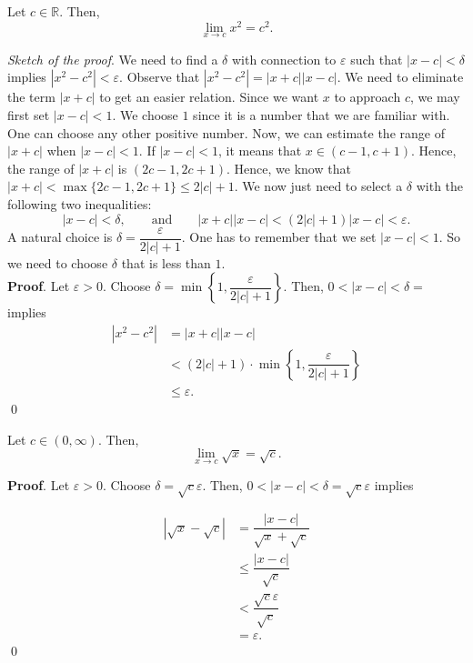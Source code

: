 \documentclass[11pt]{book}
\theoremstyle{break}
\theoremstyle{no_label}
\newcommand{\bbR}{\mathbb{R}}
\numberwithin{equation}{section}
\begin{document}
\begin{proposition}
    Let $c\in\bbR$. Then, $$\lim_{x\to c}x^2=c^2.$$
\end{proposition}
\textit{Sketch of the proof}. We need to find a $\delta$ with connection to $\varepsilon$ such that $|x-c|<\delta$ implies $|x^2-c^2|<\varepsilon$. Observe that $|x^2-c^2|=|x+c||x-c|$. We need to eliminate the term $|x+c|$ to get an easier relation. Since we want $x$ to approach $c$, we may first set $|x-c|<1$. We choose $1$ since it is a number that we are familiar with. One can choose any other positive number. Now, we can estimate the range of $|x+c|$ when $|x-c|<1$. If $|x-c|<1$, it means that $x\in(c-1, c+1)$. Hence, the range of $|x+c|$ is $(2c-1, 2c+1)$. Hence, we know that $|x+c|<\max\{2c-1, 2c+1\}\leq 2|c|+1$. We now just need to select a $\delta$ with the following two inequalities: 
\begin{equation*}
    |x-c|<\delta, \qquad\text{and}\qquad |x+c||x-c|<(2|c|+1)|x-c|<\varepsilon.
\end{equation*}
A natural choice is $\delta=\dfrac{\varepsilon}{2|c|+1}$. One has to remember that we set $|x-c|<1$. So we need to choose $\delta$ that is less than $1$.\\\setlength{\delimitershortfall}{0pt}
\textbf{Proof}. Let $\varepsilon>0$. Choose $\delta=\min\left\{1, \dfrac{\varepsilon}{2|c|+1}\right\}$. Then, $0<|x-c|<\delta=$ implies \begin{align*}
    |x^2-c^2|&=|x+c||x-c|\\
    &<(2|c|+1)\cdot\min\left\{1, \dfrac{\varepsilon}{2|c|+1}\right\}\\
    &\leq\varepsilon.
\end{align*} \qed

\setlength{\delimitershortfall}{13.5pt}

\begin{proposition}
    Let $c\in(0, \infty)$. Then, $$\lim_{x\to c}\sqrt{x}=\sqrt{c}.$$
\end{proposition}
\textbf{Proof}. Let $\varepsilon>0$. Choose $\delta=\sqrt{c}\varepsilon$. Then, $0<|x-c|<\delta=\sqrt{c}\varepsilon$ implies

\begin{align*}
    |\sqrt{x}-\sqrt{c}|&=\dfrac{|x-c|}{\sqrt{x}+\sqrt{c}}\\
    &\leq\dfrac{|x-c|}{\sqrt{c}}\\
    &<\dfrac{\sqrt{c}\varepsilon}{\sqrt{c}}\\
    &=\varepsilon.
\end{align*} \qed
\end{document}
